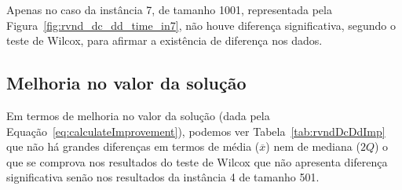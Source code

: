 








Apenas no caso da instância 7, de tamanho 1001, representada pela Figura~\ref{fig:rvnd_dc_dd_time_in7}, não houve diferença significativa, segundo o teste de Wilcox, para afirmar a existência de diferença nos dados.


\subsection{Melhoria no valor da solução}

Em termos de melhoria no valor da solução (dada pela Equação~\ref{eq:calculateImprovement}), podemos ver Tabela~\ref{tab:rvndDcDdImp} que não há grandes diferenças em termos de média ($\overline{x}$) nem de mediana ($2Q$) o que se comprova nos resultados do teste de Wilcox que não apresenta diferença significativa senão nos resultados da instância 4 de tamanho 501.

